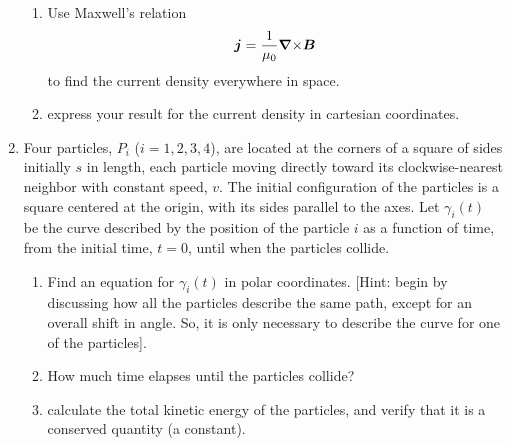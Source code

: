 \documentclass[fleqn]{article}
\newcommand{\vectr}[1]{\mbox{\boldmath{${#1}$}}}
\newcommand{\curl}[1]{\mbox{\boldmath $\nabla$} \mbox{$\times$} \mbox{\boldmath $#1$}}
\begin{document}
\begin{enumerate}
\begin{enumerate}
        \item  Use Maxwell's relation
        \[
        \vectr{j} = \frac{1}{\mu_{0}}\curl{B}
        \]
        to find the current density \vectr{j} everywhere in space.
      
        \item express your result for the current density in cartesian coordinates. 
      
        \end{enumerate}
    
    
    \item  Four particles, $P_i$ ($i=1,2,3,4$), are located at the corners of a square of sides initially $s$ in length, each particle moving directly toward its
      clockwise-nearest neighbor with constant speed, $v.$  The initial configuration of the particles is a square centered at the origin, with its sides parallel to the axes. 
      Let $\gamma_i(t)$ be the curve described by the position of the particle $i$ as a function of time, from the initial time, $t=0$, until when the particles collide. 
        \begin{enumerate}
        \item Find an equation for $\gamma_i(t)$ in polar coordinates. [Hint: begin by discussing how all the particles describe the same path, except for an overall shift in angle. So, it is only necessary to describe the curve for one of the particles]. 
    
        \item How much time elapses until the particles collide?  
    
        \item calculate the total kinetic energy of the particles, and verify that it is a conserved quantity (a constant).  
        \end{enumerate}
    
  \end{enumerate}

  \pagebreak
\end{document}
